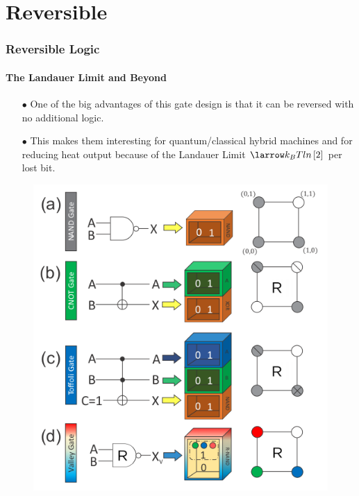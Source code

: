 \documentclass{beamer}
\begin{document}
\section[Reversible Logic]{Reversible}
\begin{frame}
\frametitle{Reversible Logic}
\framesubtitle{The Landauer Limit and Beyond}
\begin{itemize}
\item[$\bullet$] One of the big advantages of this gate design is that it can be reversed with no additional logic.
\

\item[$\bullet$] This makes them interesting for quantum/classical hybrid machines and for reducing heat output because  of the Landauer Limit $\larrow k_{B}Tln\left[2\right]$ per lost bit.
\end{itemize}
\begin{figure}
  \includegraphics[scale=0.25]{full_gate.png} 
  \end{figure} \
\end{frame}
\end{document}
